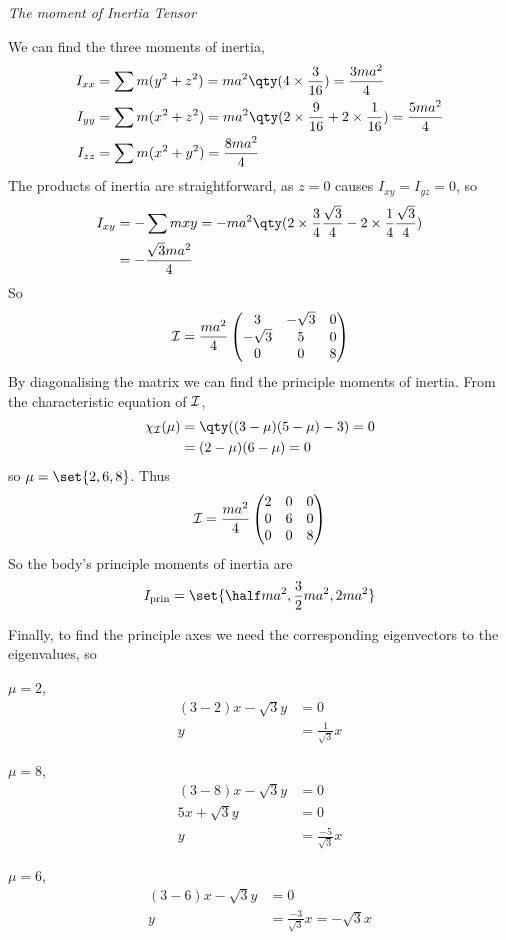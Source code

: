 \begin{example}{\em The moment of Inertia Tensor}
\begin{center}
\end{center}
We can find the three moments of inertia,
\begin{align*}
  I_{xx} &= \sum m(y^2 + z^2) = ma^2 \qty( 4 \times \frac{3}{16} ) = \frac{3 ma^2}{4}\\
I_{yy} &= \sum m( x^2 + z^2 ) = ma^2 \qty( 2 \times\frac{9}{16} + 2 \times \frac{1}{16} ) = \frac{5 ma^2}{4} \\
I_{zz} &= \sum m(x^2 + y^2 ) = \frac{8 ma^2}{4}
\end{align*}
The products of inertia are straightforward, as $z=0$ causes $I_{xy} =
I_{yz} = 0$, so
\begin{align*}
  I_{xy} &= - \sum m x y = - ma^2 \qty( 2 \times \frac{3}{4} \frac{\sqrt{3}}{4} - 2 \times \frac{1}{4} \frac{\sqrt{3}}{4} ) \\ &= - \frac{\sqrt{3}m a^2}{4}
\end{align*}
So
\[
{\cal I} = \frac{ma^2}{4}
\begin{pmatrix}
  3 & - \sqrt{3} & 0 \\
  - \sqrt{3} & 5 & 0 \\
  0 & 0 & 8
\end{pmatrix}
\]
By diagonalising the matrix we can find the principle moments of inertia. From the characteristic equation of ${\cal I}$,
\begin{align*}
  \chi_{{\cal I}}(\mu) &= \qty( (3-\mu)(5-\mu)-3 ) = 0 \\ &= (2-\mu)(6-\mu) = 0
\end{align*}
so $\mu = \set{2,6,8}$.
Thus
\[ {\cal I} = \frac{ma^2}{4}
\begin{pmatrix}
  2 & 0 & 0 \\ 0 & 6 & 0 \\ 0 & 0 & 8
\end{pmatrix}
\]
So the body's principle moments of inertia are 
\[ I_{\rm prin} = \set{ \half ma^2, \frac{3}{2} ma^2, 2 ma^2} \]

Finally, to find the principle axes we need the corresponding
eigenvectors to the eigenvalues, so

$\mu=2$,
\begin{align*}
  (3-2) x - \sqrt{3} y &= 0 \\
y &= \frac{1}{\sqrt{3}} x
\end{align*}

$\mu=8$,
\begin{align*}
  (3-8)x - \sqrt{3} y &= 0 \\
5x + \sqrt{3} y &= 0 \\
y &= \frac{-5}{\sqrt{3}} x
\end{align*}

$\mu=6$,
\begin{align*}
  (3-6) x - \sqrt{3} y &= 0 \\
y &= \frac{-3}{\sqrt{3}} x = - \sqrt{3} x
\end{align*}

\end{example}

